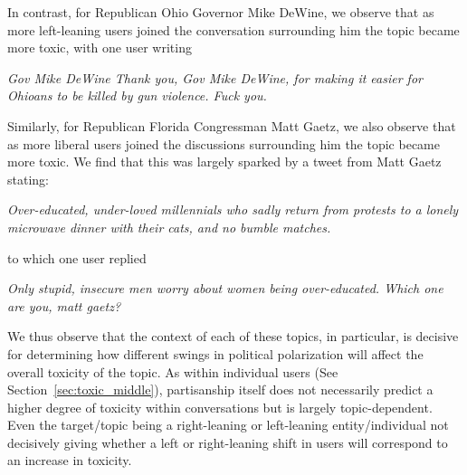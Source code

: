 In contrast, for Republican Ohio Governor Mike DeWine, we observe that as more left-leaning users joined the conversation surrounding him the topic became more toxic, with one user writing
\begin{displayquote}
\small
\textit{
Gov Mike DeWine Thank you, Gov Mike DeWine, for making it easier for Ohioans to be killed by gun violence. Fuck you.}
\end{displayquote}
Similarly, for Republican Florida Congressman Matt Gaetz, we also observe that as more liberal users joined the discussions surrounding him the topic became more toxic. We find that this was largely sparked by a tweet from Matt Gaetz stating:

\begin{displayquote}
\small
\textit{Over-educated, under-loved millennials who sadly return from protests to a lonely microwave dinner with their cats, and no bumble matches.}
\end{displayquote}
\noindent to which one user replied 
\begin{displayquote}
\small
\textit{Only stupid, insecure men worry about women being over-educated. Which one are you, matt gaetz?}
\end{displayquote}

\noindent
We thus observe that the context of each of these topics, in particular, is decisive for determining how different swings in political polarization will affect the overall toxicity of the topic. As within individual users (See Section~\ref{sec:toxic_middle}), partisanship itself does not necessarily predict a higher degree of toxicity within conversations but is largely topic-dependent. Even the target/topic being a right-leaning or left-leaning entity/individual not decisively giving whether a left or right-leaning shift in users will correspond to an increase in toxicity. 

